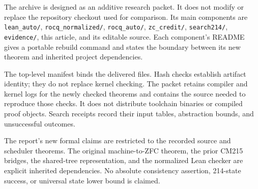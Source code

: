 \documentclass[11pt]{article}
\theoremstyle{definition}\newtheorem{definition}[theorem]{Definition}
\begin{document}
The archive is designed as an additive research packet. It does not modify or
replace the repository checkout used for comparison. Its main components are
\texttt{lean\_auto/}, \texttt{rocq\_normalized/}, \texttt{rocq\_auto/}, \texttt{zc\_credit/},
\texttt{search214/}, \texttt{evidence/}, this article, and its editable source.
Each component's README gives a portable rebuild command and states the
boundary between its new theorem and inherited project dependencies.

The top-level manifest binds the delivered files. Hash checks establish artifact
identity; they do not replace kernel checking. The packet retains compiler
and kernel logs for the newly checked theorems and contains the source needed
to reproduce those checks. It does not distribute toolchain binaries or
compiled proof objects. Search receipts record their input tables, abstraction
bounds, and unsuccessful outcomes.

The report's new formal claims are restricted to the recorded source and
scheduler theorems. The original machine-to-ZFC theorem, the prior CM215
bridges, the shared-tree representation, and the normalized Lean checker are
explicit inherited dependencies. No absolute consistency assertion, 214-state
success, or universal state lower bound is claimed.
\end{document}
